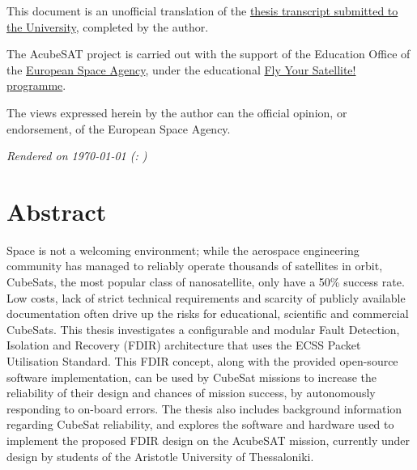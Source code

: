 \documentclass[a4paper,nobib,final]{tufte-book}
\begin{document}
\begin{fullwidth}
\par This document is an unofficial translation of the \href{https://ikee.lib.auth.gr/record/332377/?ln=en}{thesis transcript submitted to the University}, completed by the author.

\par The AcubeSAT project is carried out with the support of the Education Office of the \href{https://www.esa.int/}{European Space Agency}, under the educational \href{https://www.esa.int/Education/CubeSats_-_Fly_Your_Satellite/}{Fly Your Satellite! programme}.

\par The views expressed herein by the author can  the official opinion, or endorsement, of the European Space Agency.

\par\textit{Rendered on \today{} (\texttt{\gitcommit}: \gitcommitmessage)}
\end{fullwidth}

\tableofcontents
{}

\begin{fullwidth}
\listoffigures
{}

\listoftables
{}

\bgroup
\setlength\parskip{1ex}
\printacronyms[pages={display=all,seq/use=false},]
\egroup

\end{fullwidth}

\cleardoublepage

\chapter*{Abstract}

\justify
Space is not a welcoming environment; while the aerospace engineering community has managed to reliably operate thousands of satellites in orbit, CubeSats, the most popular class of nanosatellite, only have a 50\% success rate. Low costs, lack of strict technical requirements and scarcity of publicly available documentation often drive up the risks for educational, scientific and commercial CubeSats. This thesis investigates a configurable and modular Fault Detection, Isolation and Recovery (FDIR) architecture that uses the ECSS Packet Utilisation Standard. This FDIR concept, along with the provided open-source software implementation, can be used by CubeSat missions to increase the reliability of their design and chances of mission success, by autonomously responding to on-board errors. The thesis also includes background information regarding CubeSat reliability, and explores the software and hardware used to implement the proposed FDIR design on the AcubeSAT mission, currently under design by students of the Aristotle University of Thessaloniki.
\end{document}
